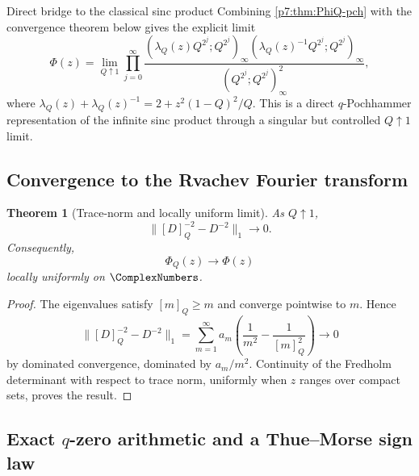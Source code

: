 \documentclass[11pt]{article}
\numberwithin{equation}{section}
\newtheorem{theorem}{Theorem}[section]
\theoremstyle{definition}
\theoremstyle{remark}
\begin{document}
\begin{resultboxPartxx}{Direct bridge to the classical sinc product}
Combining \cref{p7:thm:PhiQ-pch} with the convergence theorem below gives the explicit limit
\[
 \Phi(z)=\lim_{Q\uparrow1}
 \prod_{j=0}^{\infty}
 \frac{(\lambda_Q(z)Q^{2^j};Q^{2^j})_\infty
       (\lambda_Q(z)^{-1}Q^{2^j};Q^{2^j})_\infty}
      {(Q^{2^j};Q^{2^j})_\infty^2},
\]
where $\lambda_Q(z)+\lambda_Q(z)^{-1}=2+z^2(1-Q)^2/Q$.  This is a direct $q$-Pochhammer representation of the infinite sinc product through a singular but controlled $Q\uparrow1$ limit.
\end{resultboxPartxx}

\subsection{Convergence to the Rvachev Fourier transform}

\begin{theorem}[Trace-norm and locally uniform limit]\label{p7:thm:PhiQ-limit}
As $Q\uparrow1$,
\begin{equation}\label{p7:eq:trace-norm-limit}
 \bigl\|[D]_Q^{-2}-D^{-2}\bigr\|_1\longrightarrow0.
\end{equation}
Consequently,
\begin{equation}\label{p7:eq:PhiQ-limit}
 \boxed{\ \Phi_Q(z)\longrightarrow\Phi(z)\ }
\end{equation}
locally uniformly on $\ComplexNumbers$.
\end{theorem}

\begin{proof}
The eigenvalues satisfy $[m]_Q\ge m$ and converge pointwise to $m$.  Hence
\[
 \bigl\|[D]_Q^{-2}-D^{-2}\bigr\|_1
 =\sum_{m=1}^{\infty}a_m
 \left(\frac1{m^2}-\frac1{[m]_Q^2}\right)
 \longrightarrow0
\]
by dominated convergence, dominated by $a_m/m^2$.  Continuity of the Fredholm determinant with respect to trace norm, uniformly when $z$ ranges over compact sets, proves the result.
\end{proof}

\subsection{Exact $q$-zero arithmetic and a Thue--Morse sign law}
\end{document}
